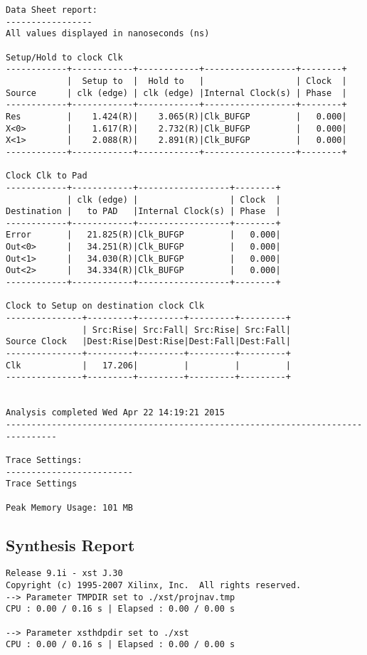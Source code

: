 \documentclass[14pt]{report}
\begin{document}
{\begin{verbatim}
Data Sheet report:
-----------------
All values displayed in nanoseconds (ns)

Setup/Hold to clock Clk
------------+------------+------------+------------------+--------+
            |  Setup to  |  Hold to   |                  | Clock  |
Source      | clk (edge) | clk (edge) |Internal Clock(s) | Phase  |
------------+------------+------------+------------------+--------+
Res         |    1.424(R)|    3.065(R)|Clk_BUFGP         |   0.000|
X<0>        |    1.617(R)|    2.732(R)|Clk_BUFGP         |   0.000|
X<1>        |    2.088(R)|    2.891(R)|Clk_BUFGP         |   0.000|
------------+------------+------------+------------------+--------+

Clock Clk to Pad
------------+------------+------------------+--------+
            | clk (edge) |                  | Clock  |
Destination |   to PAD   |Internal Clock(s) | Phase  |
------------+------------+------------------+--------+
Error       |   21.825(R)|Clk_BUFGP         |   0.000|
Out<0>      |   34.251(R)|Clk_BUFGP         |   0.000|
Out<1>      |   34.030(R)|Clk_BUFGP         |   0.000|
Out<2>      |   34.334(R)|Clk_BUFGP         |   0.000|
------------+------------+------------------+--------+

Clock to Setup on destination clock Clk
---------------+---------+---------+---------+---------+
               | Src:Rise| Src:Fall| Src:Rise| Src:Fall|
Source Clock   |Dest:Rise|Dest:Rise|Dest:Fall|Dest:Fall|
---------------+---------+---------+---------+---------+
Clk            |   17.206|         |         |         |
---------------+---------+---------+---------+---------+


Analysis completed Wed Apr 22 14:19:21 2015
--------------------------------------------------------------------------------

Trace Settings:
-------------------------
Trace Settings 

Peak Memory Usage: 101 MB
\end{verbatim}
\subsection*{Synthesis Report}
\begin{verbatim}
Release 9.1i - xst J.30
Copyright (c) 1995-2007 Xilinx, Inc.  All rights reserved.
--> Parameter TMPDIR set to ./xst/projnav.tmp
CPU : 0.00 / 0.16 s | Elapsed : 0.00 / 0.00 s
 
--> Parameter xsthdpdir set to ./xst
CPU : 0.00 / 0.16 s | Elapsed : 0.00 / 0.00 s
 

\end{verbatim}}
\end{document}
